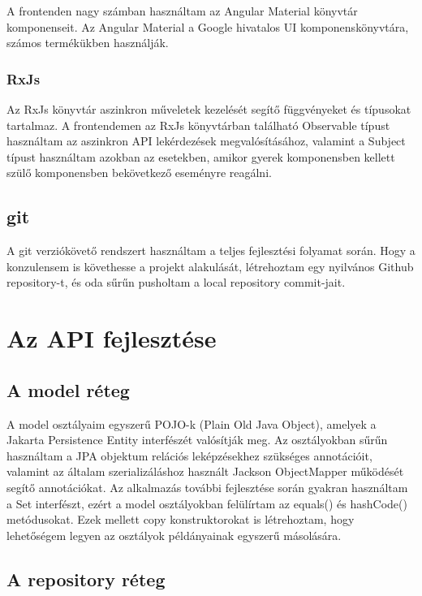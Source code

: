\documentclass[a4paper,12pt]{report}
\theoremstyle{definition}
\theoremstyle{remark}
\begin{document}
A frontenden nagy számban használtam az Angular Material\cite{Materialwebsite} könyvtár komponenseit. Az Angular Material a Google hivatalos UI komponenskönyvtára, számos termékükben használják.

	\subsection{RxJs}

Az RxJs\cite{Rxjswebsite} könyvtár aszinkron műveletek kezelését segítő függvényeket és típusokat tartalmaz. A frontendemen az RxJs könyvtárban található Observable típust használtam az aszinkron API lekérdezések megvalósításához, valamint a Subject típust használtam azokban az esetekben, amikor gyerek komponensben kellett szülő komponensben bekövetkező eseményre reagálni.

\section{git}

A git\cite{Gitwebsite} verziókövető rendszert használtam a teljes fejlesztési folyamat során. Hogy a konzulensem is követhesse a projekt alakulását, létrehoztam egy nyilvános Github\cite{GitHubwebsite} repository-t, és oda sűrűn pusholtam a local repository commit-jait.


\chapter{Az API fejlesztése}

\section{A model réteg}

A model osztályaim egyszerű POJO-k (Plain Old Java Object), amelyek a Jakarta Persistence Entity interfészét valósítják meg. Az osztályokban sűrűn használtam a JPA objektum relációs leképzésekhez szükséges annotációit, valamint az általam szerializáláshoz használt Jackson ObjectMapper működését segítő annotációkat. Az alkalmazás további fejlesztése során gyakran használtam a Set interfészt, ezért a model osztályokban felülírtam az equals() és hashCode() metódusokat. Ezek mellett copy konstruktorokat is létrehoztam, hogy lehetőségem legyen az osztályok példányainak egyszerű másolására.

\section{A repository réteg}
\end{document}
